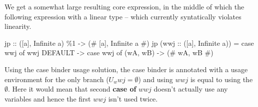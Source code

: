 \documentclass[]{lwnovathesis}
\begin{document}
We get a somewhat large resulting core expression, in the middle of which the
following expression with a linear type -- which currently syntatically violates
linearity.

\begin{code}
jp :: ([a], Infinite a) \%1 -> (# [a], Infinite a #)
jp (wwj :: ([a], Infinite a)) =
    case wwj of wwj {
        DEFAULT -> case wwj of { (wA, wB) -> (# wA, wB #) }
    }
\end{code}

Using the case binder usage solution, the case binder is annotated with a usage
environment for the only branch ($U_wwj = \emptyset$) and using $wwj$ is equal
to using the $\emptyset$. Here it would mean that second \textbf{case of} $wwj$
doesn't actually use any variables and hence the first $wwj$ isn't used twice.


\end{document}
